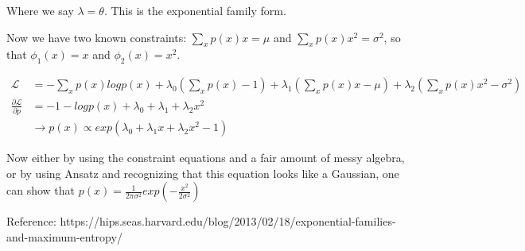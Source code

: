 \documentclass{article}
\begin{document}
Where we say $\lambda = \theta$. This is the exponential family form.



Now we have two known constraints: $\sum_x p(x) x = \mu$ and $\sum_x p(x) x^2 = \sigma^2$, so that $\phi_1(x) = x$ and $\phi_2(x) = x^2$.

\begin{align*}
\mathcal{L} &= - \sum_x p(x) log p(x) + \lambda_0 (\sum_x p(x) - 1) + \lambda_1 (\sum_x p(x) x - \mu) + \lambda_2 (\sum_x p(x) x^2 - \sigma^2) \\
\frac{\partial \mathcal{L}}{\partial p} &= -1 - log p(x) + \lambda_0 + \lambda_1 + \lambda_2 x^2\\
&\rightarrow p(x) \propto exp(\lambda_0 + \lambda_1 x + \lambda_2 x^2 - 1)
\end{align*}

Now either by using the constraint equations and a fair amount of messy algebra, or by using Ansatz and recognizing that this equation looks like a Gaussian, one can show that $p(x) = \frac{1}{2\pi\sigma^2} exp(-\frac{x^2}{2\sigma^2})$

\bigskip

Reference: https://hips.seas.harvard.edu/blog/2013/02/18/exponential-families-and-maximum-entropy/
\end{document}
